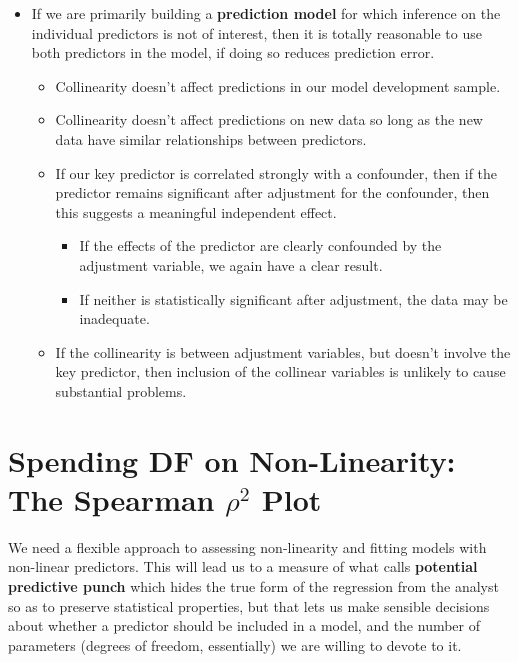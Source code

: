 \documentclass[]{book}
\providecommand{\tightlist}{%
  \setlength{\itemsep}{0pt}\setlength{\parskip}{0pt}}
\theoremstyle{definition}
\theoremstyle{definition}
\theoremstyle{definition}
\theoremstyle{remark}
\begin{document}
\begin{itemize}
\tightlist
\item
  If we are primarily building a \textbf{prediction model} for which
  inference on the individual predictors is not of interest, then it is
  totally reasonable to use both predictors in the model, if doing so
  reduces prediction error.

  \begin{itemize}
  \tightlist
  \item
    Collinearity doesn't affect predictions in our model development
    sample.
  \item
    Collinearity doesn't affect predictions on new data so long as the
    new data have similar relationships between predictors.
  \item
    If our key predictor is correlated strongly with a confounder, then
    if the predictor remains significant after adjustment for the
    confounder, then this suggests a meaningful independent effect.

    \begin{itemize}
    \tightlist
    \item
      If the effects of the predictor are clearly confounded by the
      adjustment variable, we again have a clear result.
    \item
      If neither is statistically significant after adjustment, the data
      may be inadequate.
    \end{itemize}
  \item
    If the collinearity is between adjustment variables, but doesn't
    involve the key predictor, then inclusion of the collinear variables
    is unlikely to cause substantial problems.
  \end{itemize}
\end{itemize}

\section{\texorpdfstring{Spending DF on Non-Linearity: The Spearman
\(\rho^2\)
Plot}{Spending DF on Non-Linearity: The Spearman \textbackslash{}rho\^{}2 Plot}}\label{spending-df-on-non-linearity-the-spearman-rho2-plot}

We need a flexible approach to assessing non-linearity and fitting
models with non-linear predictors. This will lead us to a measure of
what \citet{Harrell2001} calls \textbf{potential predictive punch} which
hides the true form of the regression from the analyst so as to preserve
statistical properties, but that lets us make sensible decisions about
whether a predictor should be included in a model, and the number of
parameters (degrees of freedom, essentially) we are willing to devote to
it.
\end{document}
